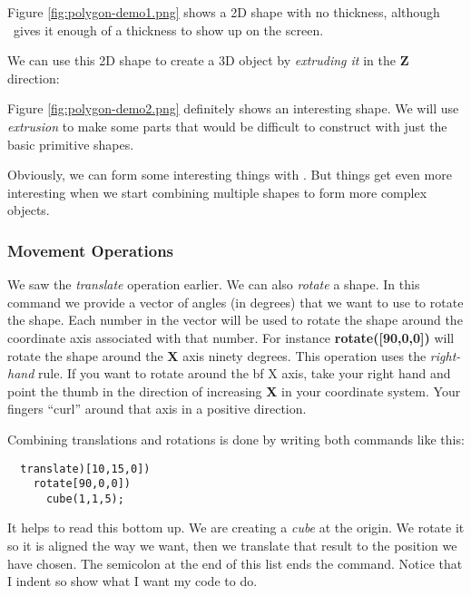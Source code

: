 
Figure \ref{fig:polygon-demo1.png} shows a  2D shape with no thickness, although
\osc\ gives it enough of a thickness to show up on the screen.

We can use this 2D shape to create a 3D object by {\it extruding it} in the
{\bf Z} direction:


Figure \ref{fig:polygon-demo2.png} definitely shows an interesting shape. We
will use {\it extrusion} to make some parts that would be difficult to construct
with just the basic primitive shapes.


Obviously, we can form some interesting things with \osc. But things get
even more interesting when we start combining multiple shapes to form more
complex objects.

\subsubsection{Movement Operations}

We saw the {\it translate} operation earlier. We can also {\it rotate} a shape.
In this command we provide a vector of angles (in degrees) that we want to use
to rotate the shape. Each number in the vector will be used to rotate the shape
around the coordinate axis associated with that number. For instance {\bf
rotate([90,0,0])} will rotate the shape around the {\bf X} axis ninety degrees.
This operation uses the {\it right-hand} rule. If you want to rotate around the
{bf X} axis, take your right hand and point the thumb in the direction of
increasing {\bf X} in your coordinate system. Your fingers ``curl'' around that
axis in a positive direction.

Combining translations and rotations is done by writing both commands like
this:

\begin{lstlisting}
  translate)[10,15,0])
    rotate[90,0,0])
      cube(1,1,5);
\end{lstlisting}

It helps to read this bottom up. We are creating a {\it cube} at the origin. We
rotate it so it is aligned the way we want, then we translate that result to
the position we have chosen. The semicolon at the end of this list ends the
command. Notice that I indent so show what I want my code to do.

